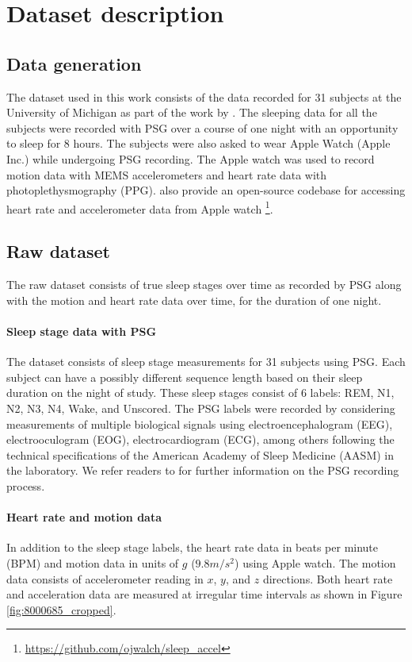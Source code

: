 \documentclass[12pt]{article}
\begin{document}
\section{Dataset description}
\subsection{Data generation}
The dataset used in this work consists of the data recorded for 31 subjects at the University of Michigan as part of the work by \citet{walch2019}.  The sleeping data for all the subjects were recorded with PSG over a course of one night with an opportunity to sleep for 8 hours. The subjects were also asked to wear Apple Watch (Apple Inc.) while undergoing PSG recording. The Apple watch was used to record motion data with MEMS accelerometers and heart rate data with photoplethysmography (PPG). \citet{walch2019} also provide an open-source codebase for accessing heart rate and accelerometer data from Apple watch \footnote{\url{https://github.com/ojwalch/sleep_accel}}. 


\subsection{Raw dataset}
The raw dataset consists of true sleep stages over time as recorded by PSG along with the motion and heart rate data over time, for the duration of one night.

\paragraph{Sleep stage data with PSG}
The dataset consists of sleep stage measurements for 31 subjects using PSG. Each subject can have a possibly different sequence length based on their sleep duration on the night of study. These sleep stages consist of 6 labels: REM, N1, N2, N3, N4, Wake, and Unscored. The PSG labels were recorded by considering measurements of multiple biological signals using electroencephalogram (EEG), electrooculogram (EOG), electrocardiogram (ECG), among others following the technical specifications of the American Academy of Sleep Medicine (AASM) \citep{berry2015aasm} in the laboratory. We refer readers to \citet{walch2019} for further information on the PSG recording process. 


\paragraph{Heart rate and motion data} In addition to the sleep stage labels, the heart rate data in beats per minute (BPM) and motion data in units of $g$ ($9.8 m/s^2$) using Apple watch. The motion data consists of accelerometer reading in $x$, $y$, and $z$ directions. Both heart rate and acceleration data are measured at irregular time intervals as shown in Figure \ref{fig:8000685_cropped}. 
\end{document}
